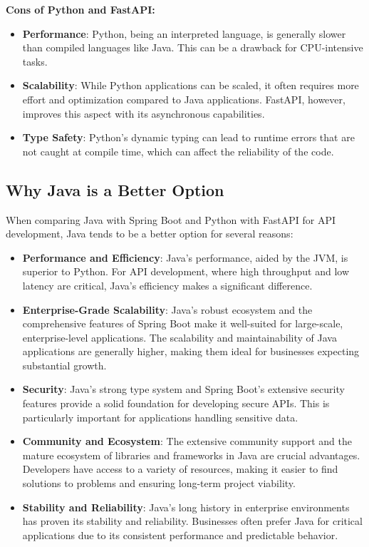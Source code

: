 \textbf{Cons of Python and FastAPI:}
\begin{itemize}
    \item \textbf{Performance}: Python, being an interpreted language, is generally slower than compiled languages like Java. This can be a drawback for CPU-intensive tasks.
    \item \textbf{Scalability}: While Python applications can be scaled, it often requires more effort and optimization compared to Java applications. FastAPI, however, improves this aspect with its asynchronous capabilities.
    \item \textbf{Type Safety}: Python's dynamic typing can lead to runtime errors that are not caught at compile time, which can affect the reliability of the code.
\end{itemize}

\subsection{Why Java is a Better Option}

When comparing Java with Spring Boot and Python with FastAPI for API development, Java tends to be a better option for several reasons:

\begin{itemize}
    \item \textbf{Performance and Efficiency}: Java's performance, aided by the JVM, is superior to Python. For API development, where high throughput and low latency are critical, Java's efficiency makes a significant difference.
    \item \textbf{Enterprise-Grade Scalability}: Java's robust ecosystem and the comprehensive features of Spring Boot make it well-suited for large-scale, enterprise-level applications. The scalability and maintainability of Java applications are generally higher, making them ideal for businesses expecting substantial growth.
    \item \textbf{Security}: Java's strong type system and Spring Boot's extensive security features provide a solid foundation for developing secure APIs. This is particularly important for applications handling sensitive data.
    \item \textbf{Community and Ecosystem}: The extensive community support and the mature ecosystem of libraries and frameworks in Java are crucial advantages. Developers have access to a variety of resources, making it easier to find solutions to problems and ensuring long-term project viability.
    \item \textbf{Stability and Reliability}: Java's long history in enterprise environments has proven its stability and reliability. Businesses often prefer Java for critical applications due to its consistent performance and predictable behavior.
\end{itemize}

